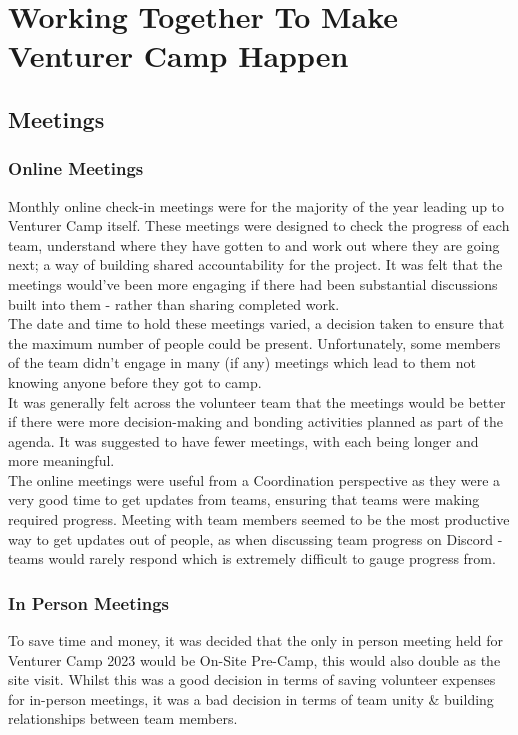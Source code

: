 \chapter{Working Together To Make Venturer Camp Happen}
\section{Meetings}
\subsection{Online Meetings}
Monthly online check-in meetings were for the majority of the year leading up to Venturer Camp itself. These meetings were designed to check the progress of each team, understand where they have gotten to and work out where they are going next; a way of building shared accountability for the project. It was felt that the meetings would've been more engaging if there had been substantial discussions built into them - rather than sharing completed work. \\

The date and time to hold these meetings varied, a decision taken to ensure that the maximum number of people could be present. Unfortunately, some members of the team didn't engage in many (if any) meetings which lead to them not knowing anyone before they got to camp. \\

It was generally felt across the volunteer team that the meetings would be better if there were more decision-making and bonding activities planned as part of the agenda. It was suggested to have fewer meetings, with each being longer and more meaningful. \\

The online meetings were useful from a Coordination perspective as they were a very good time to get updates from teams, ensuring that teams were making required progress. Meeting with team members seemed to be the most productive way to get updates out of people, as when discussing team progress on Discord - teams would rarely respond which is extremely difficult to gauge progress from. 

\subsection{In Person Meetings}
To save time and money, it was decided that the only in person meeting held for Venturer Camp 2023 would be On-Site Pre-Camp, this would also double as the site visit. Whilst this was a good decision in terms of saving volunteer expenses for in-person meetings, it was a bad decision in terms of team unity \& building relationships between team members.\\

